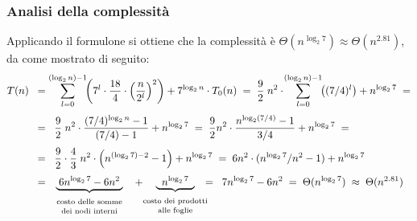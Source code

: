 \subsubsection*{Analisi della complessità}
Applicando il formulone si ottiene che la complessità è \(\Theta(n^{\log_2 7}) \approx \Theta(n^{2.81})\), da come mostrato di seguito:
\begin{align*}
	T(n) \;\; &= \sum_{l=0}^{(\log_2 n) - 1} \!\! \left( 7^l \cdot \frac{18}{4} \cdot \left( \frac{n}{2^l} \right)^2 \right) + 7^{\log_2 n} \cdot T_0(n) \; = \; \frac{9}{2} \; n^2 \cdot \! \sum_{l=0}^{(\log_2 n) - 1} \!\! \left( (7/4)^l \right) + n^{\log_2 7} \; = \\[3pt]
	&= \;\; \frac{9}{2} \; n^2 \cdot \frac{(7/4)^{\log_2 n} - 1}{(7/4) - 1} + n^{\log_2 7} \; = \; \frac{9}{2} n^2 \cdot \frac{n^{\log_2 (7/4)} - 1}{3/4} + n^{\log_2 7} \; = \\[3pt]
	&= \;\; \frac{9}{2} \cdot \frac{4}{3} \; n^2 \cdot \left( n^{(\log_2 7) - 2} - 1 \right) + n^{\log_2 7} \; = \; 6 n^2 \cdot (n^{\log_2 7}/n^2 - 1) + n^{\log_2 7} \\[3pt]
	&= \; \underbrace{\; 6 n^{\log_2 7} - 6n^2 \;}_{\begin{array}{c} \text{\scriptsize costo delle somme} \\[-3pt] \text{\scriptsize dei nodi interni} \end{array}}
	\;\; + \!\!\!\! \underbrace{\;\; n^{\log_2 7} \;\;}_{\begin{array}{c} \text{\scriptsize costo dei prodotti} \\[-3pt] \text{\scriptsize alle foglie} \end{array}}
	\!\!\!\!\!\! = \;\; 7n^{\log_2 7} - 6n^2 \; = \; \Theta(n^{\log_2 7}) \; \approx \; \Theta(n^{2.81})
\end{align*}

